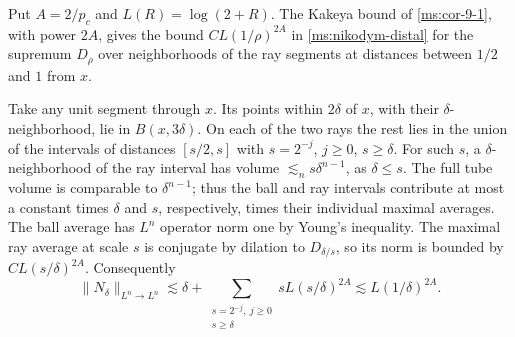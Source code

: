 Put \(A=2/p_c\) and \(L(R)=\log(2+R)\). The Kakeya bound of \ref{ms:cor-9-1}, with power \(2A\), gives the bound \(C L(1/\rho)^{2A}\) in \ref{ms:nikodym-distal} for the supremum \(D_\rho\) over neighborhoods of the ray segments at distances between \(1/2\) and \(1\) from \(x\).

Take any unit segment through \(x\). Its points within \(2\delta\) of \(x\), with their \(\delta\)-neighborhood, lie in \(B(x,3\delta)\). On each of the two rays the rest lies in the union of the intervals of distances \([s/2,s]\) with \(s=2^{-j}\), \(j\ge0\), \(s\ge\delta\). For such \(s\), a \(\delta\)-neighborhood of the ray interval has volume \(\lesssim_n s\delta^{n-1}\), as \(\delta\le s\). The full tube volume is comparable to \(\delta^{n-1}\); thus the ball and ray intervals contribute at most a constant times \(\delta\) and \(s\), respectively, times their individual maximal averages. The ball average has \(L^n\) operator norm one by Young's inequality. The maximal ray average at scale \(s\) is conjugate by dilation to \(D_{\delta/s}\), so its norm is bounded by \(C L(s/\delta)^{2A}\). Consequently
\[
 \|N_\delta\|_{L^n\to L^n}
 \lesssim \delta+\sum_{\substack{s=2^{-j},\ j\ge0\\ s\ge\delta}}sL(s/\delta)^{2A}
 \lesssim L(1/\delta)^{2A}.
\]

